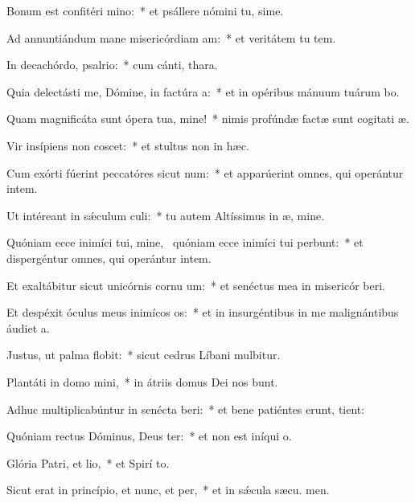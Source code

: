 \item Bonum est confitéri mino:~* et psállere nómini tu, sime.
\item Ad annuntiándum mane misericórdiam am:~* et veritátem tu  tem.
\item In decachórdo, psalrio:~* cum cánti,  thara.
\item Quia delectásti me, Dómine, in factúra a:~* et in opéribus mánuum tuárum bo.
\item Quam magnificáta sunt ópera tua, mine!~* nimis profúndæ factæ sunt cogitati æ.
\item Vir insípiens non coscet:~* et stultus non in hæc.
\item Cum exórti fúerint peccatóres sicut num:~* et apparúerint omnes, qui operántur intem.
\item Ut intéreant in sǽculum culi:~* tu autem Altíssimus in æ, mine.
\item Quóniam ecce inimíci tui, mine,~\pscross{} quóniam ecce inimíci tui perbunt:~* et dispergéntur omnes, qui operántur intem.
\item Et exaltábitur sicut unicórnis cornu um:~* et senéctus mea in misericór beri.
\item Et despéxit óculus meus inimícos os:~* et in insurgéntibus in me malignántibus áudiet  a.
\item Justus, ut palma flobit:~* sicut cedrus Líbani mulbitur.
\item Plantáti in domo mini,~* in átriis domus Dei nos bunt.
\item Adhuc multiplicabúntur in senécta beri:~* et bene patiéntes erunt,  tient:
\item Quóniam rectus Dóminus, Deus ter:~* et non est iníqui  o.
\item Glória Patri, et lio,~* et Spirí to.
\item Sicut erat in princípio, et nunc, et per,~* et in sǽcula sæcu. men.
